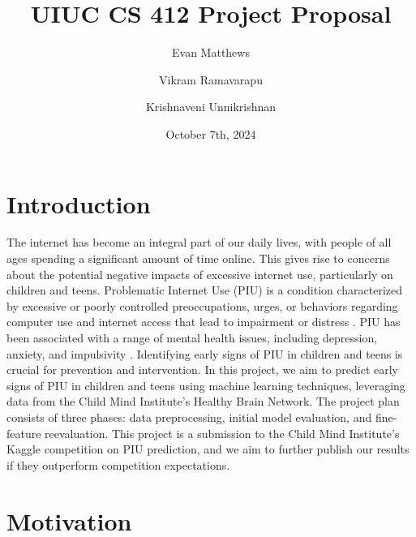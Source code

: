 \documentclass[12pt]{extarticle}
\title{UIUC CS 412 Project Proposal}
\author[1]{Evan Matthews}
\author[1]{Vikram Ramavarapu}
\author[1]{Krishnaveni Unnikrishnan}
\affil[1]{Siebel School of Computing and Data Science}
\date{October 7th, 2024}
\begin{document}
\maketitle

\section{Introduction}




The internet has become an integral part of our daily lives, with people of all ages spending a significant amount of time online. This gives rise to concerns about the potential negative impacts of excessive internet use, particularly on children and teens.
Problematic Internet Use (PIU) is a condition characterized by excessive or poorly controlled preoccupations, urges, or behaviors regarding computer use and internet access that lead to impairment or distress \cite{Pettorruso2020-qt}. PIU has been associated with a range of mental health issues, including depression, anxiety, and impulsivity \cite{Cash2012-rb}.
Identifying early signs of PIU in children and teens is crucial for prevention and intervention.
In this project, we aim to predict early signs of PIU in children and teens using machine learning techniques, leveraging data from the Child Mind Institute's Healthy Brain Network.
The project plan consists of three phases: data preprocessing, initial model evaluation, and fine-feature reevaluation.
This project is a submission to the Child Mind Institute's Kaggle competition on PIU prediction, and we aim to further publish our results if they outperform competition expectations.

\section{Motivation}
\end{document}
